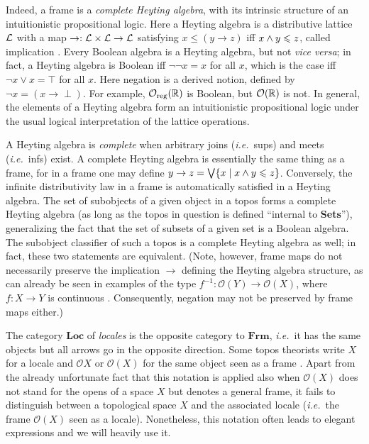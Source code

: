 \documentclass[11pt]{article}
\newcommand{\Sets}{\mbox{\textbf{Sets}}}
\newcommand{\raw}{\rightarrow} \newcommand{\rat}{\mapsto}
\newcommand{\x}{\times} \newcommand{\hb}{\hbar}
\newcommand{\inv}{^{-1}}
\newcommand{\CO}{{\mathcal O}} \newcommand{\CP}{{\mathcal P}}
\newcommand{\ie}{\textit{i.e.}}
\begin{document}
Indeed, a frame is a  {\it complete Heyting algebra}, with its intrinsic
structure of an intuitionistic propositional logic.
Here a  Heyting algebra
is a distributive lattice ${\mathcal L}$ with a map $\raw:\CL\x\CL\raw\CL$
satisfying $x\leqslant (y\raw z)$
iff $x\wedge y\leqslant z$, called implication  \cite{goldblatt84,maclanemoerdijk92,Vic:LocTopSp}.  Every Boolean algebra is
a Heyting algebra, but not {\it vice versa}; in fact, a Heyting
algebra is Boolean iff $\neg\neg x=x$ for all $x$, which is the case
iff $\neg x\vee x=\top$  for all $x$. Here negation is a derived
notion, defined by $\neg x=(x\raw\perp)$. For example,  $\CO_{\mathrm{reg}}(\R)$ is Boolean, but $\CO(\R)$ is not.
In general, the elements of a Heyting algebra
form an  intuitionistic propositional logic under the usual logical  interpretation of the
lattice operations.

A  Heyting algebra is {\it complete} when arbitrary
joins (\ie\ sups) and meets (\ie\ infs) exist.
A complete Heyting algebra is essentially the same thing as a
frame, for
 in a frame one may define $y\raw z=\bigvee\{x\mid x\wed y\leqslant z\}$.
Conversely, the infinite distributivity law in a frame is
automatically satisfied in a Heyting algebra.
The set of subobjects of a given object in a
topos forms a complete Heyting algebra (as long as the topos in question is defined ``internal to \Sets''), generalizing the fact that the set of
subsets of a given set is a Boolean algebra. The subobject classifier
of such a topos is a complete Heyting algebra as well; in fact, these two statements
are equivalent.  (Note, however, frame maps do not necessarily preserve the implication
$\raw$ defining the Heyting algebra structure, as can already be seen in
examples of the type $f\inv:\CO(Y)\raw \CO(X)$, where $f:X\raw Y$ is
continuous \cite{maclanemoerdijk92}. Consequently, negation may not be preserved by frame maps either.)


The category  $\mathbf{Loc}$ of {\it locales} is the opposite category to  $\mathbf{Frm}$, \ie\ it has the same objects but all arrows go in the opposite direction.
Some topos theorists write $X$ for a locale and $\CO X$  or $\CO(X)$ for the
same object seen as a frame  \cite{johnstone82,maclanemoerdijk92,Vic:LocTopSp}.
Apart from the already unfortunate fact that this notation is applied also when $\CO(X)$ does not stand for the opens of a space $X$ but denotes a general frame,
it fails  to distinguish between
a topological space $X$ and the associated locale (\ie\ the frame $\CO(X)$ seen as a locale).
Nonetheless, this notation often leads to elegant expressions and we will heavily use it.
\end{document}
